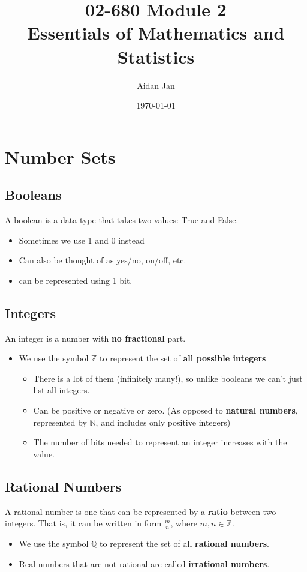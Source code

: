 \documentclass[10pt]{article}
\title{02-680 Module 2 \\ \large{Essentials of Mathematics and Statistics}}
\author{Aidan Jan}
\date{\today}
\begin{document}
\maketitle

\section*{Number Sets}
\subsection*{Booleans}
A boolean is a data type that takes two values: True and False.
\begin{itemize}
	\item Sometimes we use 1 and 0 instead
	\item Can also be thought of as yes/no, on/off, etc.
	\item can be represented using 1 bit.
\end{itemize}

\subsection*{Integers}
An integer is a number with \textbf{no fractional} part.
\begin{itemize}
	\item We use the symbol $\mathbb{Z}$ to represent the set of \textbf{all possible integers}
	\begin{itemize}
	    \item There is a lot of them (infinitely many!), so unlike booleans we can't just list all integers.
	    \item Can be positive or negative or zero. (As opposed to \textbf{natural numbers}, represented by $\mathbb{N}$, and includes only positive integers)
	    \item The number of bits needed to represent an integer increases with the value.
    \end{itemize}
\end{itemize}

\subsection*{Rational Numbers}
A rational number is one that can be represented by a \textbf{ratio} between two integers.  That is, it can be written in form $\frac{m}{n}$, where $m, n \in \mathbb{Z}$.
\begin{itemize}
	\item We use the symbol $\mathbb{Q}$ to represent the set of all \textbf{rational numbers}.
	\item Real numbers that are not rational are called \textbf{irrational numbers}.
\end{itemize}
\end{document}
